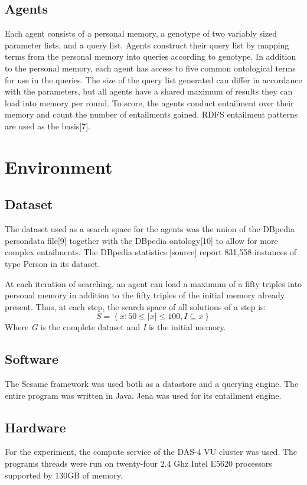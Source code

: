 \documentclass[thesis,12pt]{article}
\begin{document}
\subsection{Agents}
Each agent consists of a personal memory, a genotype of two variably sized parameter lists, and a query list. Agents construct their query list by mapping terms from the personal memory into queries according to genotype. In addition to the personal memory, each agent has access to five common ontological terms for use in the queries. The size of the query list generated can differ in accordance with the parameters, but all agents have a shared maximum of results they can load into memory per round.
To score, the agents conduct entailment over their memory and count the number of entailments gained. RDFS entailment patterns are used as the basis[7].

\section{Environment}

\subsection{Dataset}
The dataset used as a search space for the agents was the union of the DBpedia persondata file[9] together with the DBpedia ontology[10] to allow for more complex entailments. The DBpedia statistics [source] report 831,558 instances of type Person in its dataset. 

At each iteration of searching, an agent can load a maximum of a fifty triples into personal memory in addition to the fifty triples of the initial memory already present. Thus, at each step, the search space of all solutions of a step is:
\begin{equation}
S = \left \{  x : 50 \leq \left | x \right |\leq 100, I\subseteq x\right \}
\end{equation}
Where \textit{G} is the complete dataset and \textit{I} is the initial memory.

\subsection{Software}
The Sesame framework was used both as a datastore and a querying engine. The entire program was written in Java. Jena was used for its entailment engine.

\subsection{Hardware}
For the experiment, the compute service of the DAS-4 VU cluster was used. The programs threads were run on twenty-four 2.4 Ghz Intel E5620 processors supported by 130GB of memory.
\end{document}

